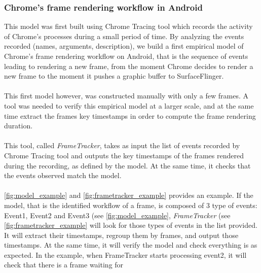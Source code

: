 \documentclass{kththesis}
\begin{document}
    \iffalse
    \subsubsection{Chrome's frame rendering workflow in Android}
    
    This model was first built using Chrome Tracing tool which records the activity of Chrome's processes during a small period of time. By analyzing the events recorded (names, arguments, description), we build a first empirical model of Chrome's frame rendering workflow on Android, that is the sequence of events leading to rendering a new frame, from the moment Chrome decides to render a new frame to the moment it pushes a graphic buffer to SurfaceFlinger. 
    
    \paragraph{}
    This first model however, was constructed manually with only a few frames. A tool was needed to verify this empirical model at a larger scale, and at the same time extract the frames key timestamps in order to compute the frame rendering duration.
    
    \paragraph{}
    This tool, called \textit{FrameTracker}, takes as input the list of events recorded by Chrome Tracing tool and outputs the key timestamps of the frames rendered during the recording, as defined by the model. At the same time, it checks that the events observed match the model. 
    
    \paragraph{}
    \autoref{fig:model_example} and \autoref{fig:frametracker_example} provides an example. If the model, that is the identified workflow of a frame, is composed of 3 type of events: Event1, Event2 and Event3 (see \autoref{fig:model_example}, \textit{FrameTracker} (see \autoref{fig:frametracker_example} will look for those types of events in the list provided. It will extract their timestamps, regroup them by frames, and output those timestamps. At the same time, it will verify the model and check everything is as expected. In the example, when FrameTracker starts processing event2, it will check that there is a frame waiting for 
    
\end{document}
